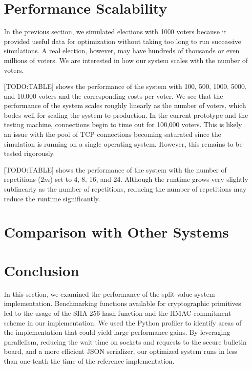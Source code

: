 \section{Performance Scalability}

In the previous section, we simulated elections with 1000 voters because it provided useful data for optimization without taking too long to run successive simulations. A real election, however, may have hundreds of thousands or even millions of voters. We are interested in how our system scales with the number of voters.

[TODO:TABLE] shows the performance of the system with 100, 500, 1000, 5000, and 10,000 voters and the corresponding costs per voter. We see that the performance of the system scales roughly linearly as the number of voters, which bodes well for scaling the system to production. In the current prototype and the testing machine, connections begin to time out for 100,000 voters. This is likely an issue with the pool of TCP connections becoming saturated since the simulation is running on a single operating system. However, this remains to be tested rigorously.

[TODO:TABLE] shows the performance of the system with the number of repetitions ($2m$) set to 4, 8, 16, and 24. Although the runtime grows very slightly sublinearly as the number of repetitions, reducing the number of repetitions may reduce the runtime significantly.

\section{Comparison with Other Systems}


\section{Conclusion}

In this section, we examined the performance of the split-value system implementation. Benchmarking functions available for cryptographic primitives led to the usage of the SHA-256 hash function and the HMAC commitment scheme in our implementation. We used the Python profiler to identify areas of the implementation that could yield large performance gains. By leveraging parallelism, reducing the wait time on sockets and requests to the secure bulletin board, and a more efficient JSON serializer, our optimized system runs in less than one-tenth the time of the reference implementation.

